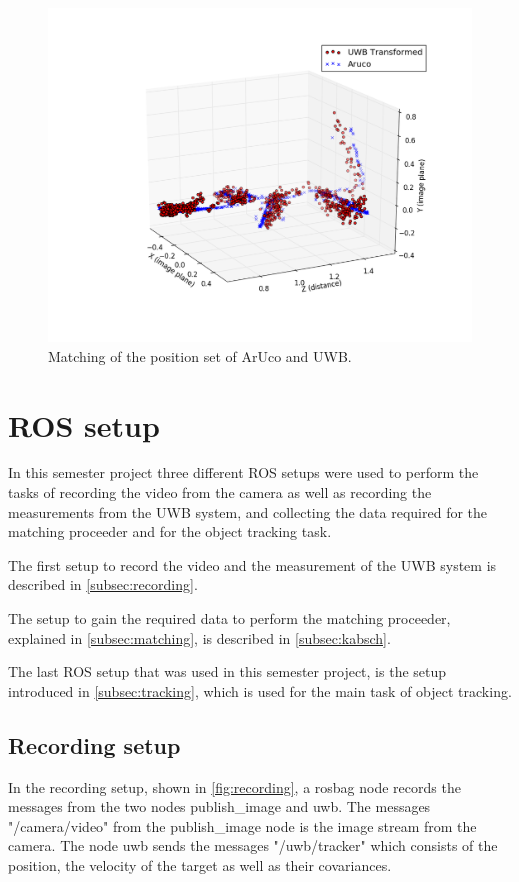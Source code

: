 \begin{figure}[ht!]\centering
	\includegraphics[width=1.0\textwidth]{figures/matching}
	\caption{Matching of the position set of ArUco and \ac{UWB}.}\label{fig:matching}
\end{figure} 

\section{\acf{ROS} setup}
In this semester project three different \ac{ROS} setups were used to perform the tasks of recording the video from the camera as well as recording the measurements from the \ac{UWB} system, and collecting the data required for the matching proceeder and for the object tracking task.

The first setup to record the video and the measurement of the \ac{UWB} system is described in \autoref{subsec:recording}.

The setup to gain the required data to perform the matching proceeder, explained in \autoref{subsec:matching}, is described in \autoref{subsec:kabsch}.

The last \ac{ROS} setup that was used in this semester project, is the setup introduced in \autoref{subsec:tracking}, which is used for the main task of object tracking.

\subsection{Recording setup}\label{subsec:recording}
In the recording setup, shown in \autoref{fig:recording}, a rosbag node records the messages from the two nodes publish\_image and uwb. The messages "/camera/video" from the publish\_image node is the image stream from the camera. The node uwb sends the messages "/uwb/tracker" which consists of the position, the velocity of the target as well as their covariances.


